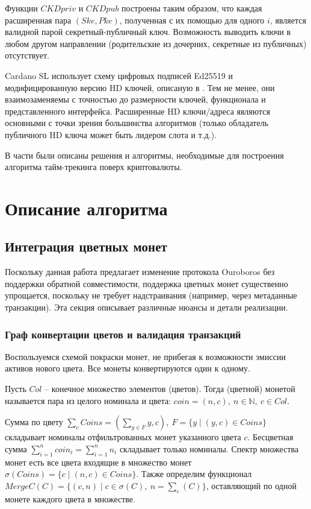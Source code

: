 \documentclass[specification,annotation]{itmo-student-thesis}
\begin{document}
Функции $CKDpriv$ и $CKDpub$ построены таким образом, что каждая
расширенная пара $(Ske,Pke)$, полученная с их помощью для одного $i$,
является валидной парой секретный-публичный ключ. Возможность выводить
ключи в любом другом направлении (родительские из дочерних, секретные
из публичных) отсутствует.

Cardano SL использует схему цифровых подписей Ed25519
\cite{bernstein2012high} и модифицированную версию HD ключей, описаную
в \cite{ed25519hd}. Тем не менее, они взаимозаменяемы с точностью до
размерности ключей, функционала и представленного
интерфейса. Расширенные HD ключи/адреса являются основными с точки
зрения большинства алгоритмов (только обладатель публичного HD ключа
может быть лидером слота и т.д.).

\chapterconclusion

В части были описаны решения и алгоритмы, необходимые для построения
алгоритма тайм-трекинга поверх криптовалюты.

\chapter{Описание алгоритма}

\section{Интеграция цветных монет}

Поскольку данная работа предлагает изменение протокола Ouroboros без
поддержки обратной совместимости, поддержка цветных монет существенно
упрощается, поскольку не требует надстраивания (например, через
метаданные транзакции). Эта секция описывает различные нюансы и детали
реализации.

\subsection{Граф конвертации цветов и валидация транзакций}

Воспользуемся схемой покраски монет, не прибегая к возможности эмиссии
активов нового цвета. Все монеты конвертируются один к одному.

\begin{definition}
Пусть $Col$ -- конечное множество элементов (цветов). Тогда (цветной)
монетой называется пара из целого номинала и цвета: $coin = (n,c), \ n
\in \mathbb{N}, \ c \in Col$.
\end{definition}

Сумма по цвету $\sum_c{Coins} = (\sum_{y \in F}{y}, c), \ F = \{y \mid
(y,c) \in Coins\}$ складывает номиналы отфильтрованных монет
указанного цвета $c$. Бесцветная сумма $\sum_{i=1}^n{coin_i} =
\sum_{i=1}^n{n_i}$ складывает только номиналы. Спектр множества монет
есть все цвета входящие в множество монет $\sigma(Coins) = \{c \mid
(n,c) \in Coins\}$. Также определим функционал $MergeC(C) = \{(c,n)
\mid c \in \sigma(C), \ n = \sum_c(C)\}$, оставляющий по одной монете
каждого цвета в множестве.
\end{document}
